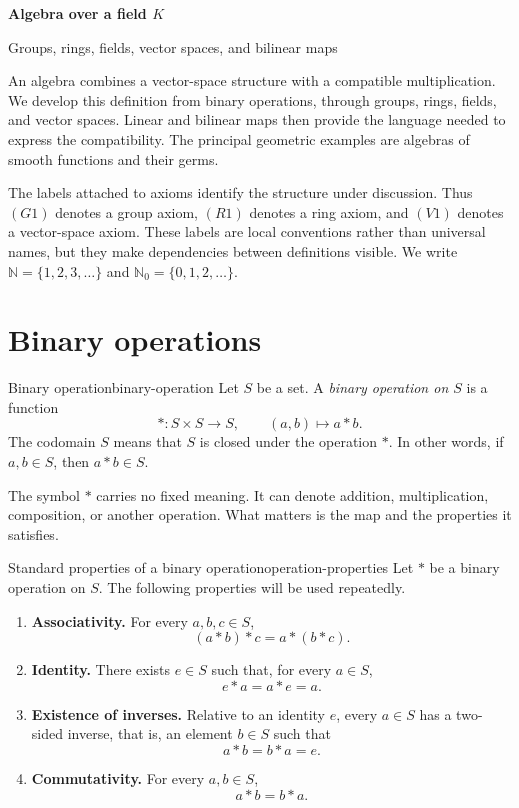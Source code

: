 \documentclass[10pt,a4paper]{article}
\newcommand{\N}{\mathbb{N}}
\begin{document}
\begin{center}
  {\Huge\bfseries\color{vuBurgundy}Algebra over a field $K$\par}
  \vspace{2mm}
  {{\large Groups, rings, fields, vector spaces, and bilinear maps\par}}
\end{center}

An algebra combines a vector-space structure with a compatible multiplication.
We develop this definition from binary operations, through groups, rings,
fields, and vector spaces. Linear and bilinear maps then provide the language
needed to express the compatibility. The principal geometric examples are
algebras of smooth functions and their germs.

The labels attached to axioms identify the structure under discussion. Thus
$(G1)$ denotes a group axiom, $(R1)$ denotes a ring axiom, and $(V1)$ denotes a
vector-space axiom. These labels are local conventions rather than universal
names, but they make dependencies between definitions visible.
We write $\N=\{1,2,3,\ldots\}$ and $\N_0=\{0,1,2,\ldots\}$.

\section{Binary operations}

\begin{definition}{Binary operation}{binary-operation}
Let $S$ be a set. A \emph{binary operation on $S$} is a function
\[
  \ast:S\times S\longrightarrow S,
  \qquad
  (a,b)\longmapsto a\ast b.
\]
The codomain $S$ means that $S$ is closed under the operation $\ast$.
In other words, if $a,b\in S$, then $a\ast b\in S$.
\end{definition}

The symbol $\ast$ carries no fixed meaning. It can denote addition,
multiplication, composition, or another operation. What matters is the map and
the properties it satisfies.

\begin{definition}{Standard properties of a binary operation}{operation-properties}
Let $\ast$ be a binary operation on $S$. The following properties will be
used repeatedly.
\begin{enumerate}[label=\textup{(O\arabic*)}]
  \item \textbf{Associativity.} For every $a,b,c\in S$,
  \[
    (a\ast b)\ast c=a\ast(b\ast c).
  \]

  \item \textbf{Identity.} There exists $e\in S$ such that, for every
  $a\in S$,
  \[
    e\ast a=a\ast e=a.
  \]

  \item \textbf{Existence of inverses.} Relative to an identity $e$, every
  $a\in S$ has a two-sided inverse, that is, an element $b\in S$ such that
  \[
    a\ast b=b\ast a=e.
  \]

  \item \textbf{Commutativity.} For every $a,b\in S$,
  \[
    a\ast b=b\ast a.
  \]
\end{enumerate}
\end{definition}
\end{document}
